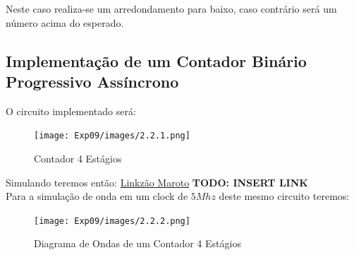 \documentclass[12pt]{article}
\begin{document}
Neste caso realiza-se um arredondamento para baixo, caso contrário será um número acima do esperado.

\subsection{Implementação de um Contador Binário Progressivo Assíncrono}\label{sec:2.2}

O circuito implementado será:
\begin{figure}[H]
  \centering
  \texttt{[image: Exp09/images/2.2.1.png]}
  \caption{Contador 4 Estágios}\label{fig:2.2.1.png}
\end{figure}

Simulando teremos então:
\href{google.com}{Linkzão Maroto}
\textbf{TODO: INSERT LINK}
\\
Para a simulação de onda em um clock de $5Mhz$ deste mesmo circuito teremos:
\begin{figure}[H]
  \centering
  \texttt{[image: Exp09/images/2.2.2.png]}
  \caption{Diagrama de Ondas de um Contador 4 Estágios}\label{fig:2.2.2.png}
\end{figure}
\end{document}
